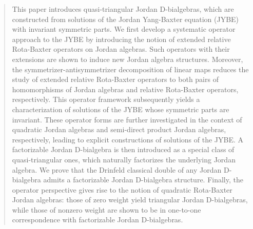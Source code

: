 \documentclass[12pt, reqno, a4paper]{amsart}
\theoremstyle{definition}
\begin{document}
\begin{abstract}
	This paper introduces quasi-triangular Jordan D-bialgebras, which are constructed from solutions of the Jordan Yang-Baxter equation (JYBE) with invariant symmetric parts.
	We first develop a systematic operator approach to the JYBE by introducing the notion of extended relative Rota-Baxter operators on Jordan algebras.
	Such operators with their extensions are shown to induce new Jordan algebra structures. 
	Moreover, the symmetrizer-antisymmetrizer decomposition of linear maps reduces the study of extended relative Rota-Baxter operators to both pairs of homomorphisms of Jordan algebras and relative Rota-Baxter operators, respectively.
	This operator framework subsequently yields a characterization of solutions of the JYBE whose symmetric parts are invariant.
	These operator forms are further investigated in the context of quadratic Jordan algebras and semi-direct product Jordan algebras, respectively, leading to explicit constructions of solutions of the JYBE.
	A factorizable Jordan D-bialgebra is then introduced as a special class of quasi-triangular ones, which naturally factorizes the underlying Jordan algebra.
	We prove that the Drinfeld classical double of any Jordan D-bialgebra admits a factorizable Jordan D-bialgebra structure.
	Finally, the operator perspective gives rise to the notion of quadratic Rota-Baxter Jordan algebras: those of zero weight yield triangular Jordan D-bialgebras, while those of nonzero weight are shown to be in one-to-one correspondence with factorizable Jordan D-bialgebras.
\end{abstract}

\maketitle

\tableofcontents

\end{document}
